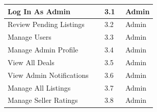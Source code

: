\documentclass[10pt,a4paper]{article}
\begin{document}
{\begin{tabularx}{\linewidth}{|X|p{0.14\linewidth}|p{0.2\linewidth}|}
Log In As Admin & 3.1 & Admin\\\hline
Review Pending Listings & 3.2 & Admin\\\hline
Manage Users & 3.3 & Admin\\\hline
Manage Admin Profile & 3.4 & Admin\\\hline
View All Deals & 3.5 & Admin\\\hline
View Admin Notifications & 3.6 & Admin\\\hline
Manage All Listings & 3.7 & Admin\\\hline
Manage Seller Ratings & 3.8 & Admin\\\hline
\end{tabularx}}




\end{document}
